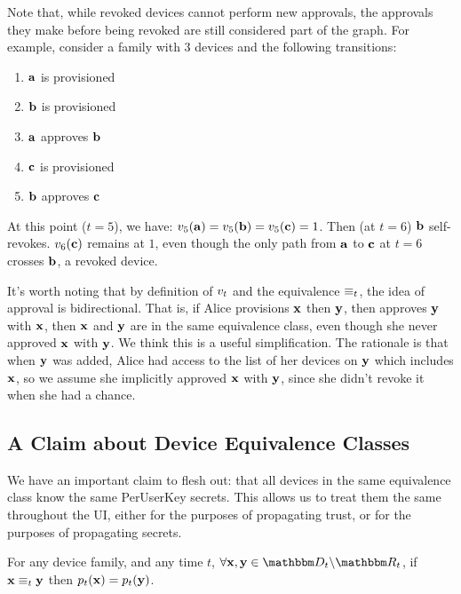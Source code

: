 Note that, while revoked devices cannot perform new approvals, the approvals they make before being
revoked are still considered part of the graph. For example, consider a family with 3 devices and
the following transitions: 
\begin{enumerate}
  \item $\mathbf{a}$ is provisioned
  \item $\mathbf{b}$ is provisioned
  \item $\mathbf{a}$ approves $\mathbf{b}$
  \item $\mathbf{c}$ is provisioned
  \item $\mathbf{b}$ approves $\mathbf{c}$
\end{enumerate}
At this point ($t=5$), we have: $v_5(\mathbf{a}) = v_5(\mathbf{b}) = v_5(\mathbf{c}) =
1$. Then (at $t=6$) $\mathbf{b}$ self-revokes. $v_6(\mathbf{c})$ remains at $1$, even though the
only path from $\mathbf{a}$ to $\mathbf{c}$ at $t=6$ crosses $\mathbf{b}$, a revoked device.

It's worth noting that by definition of $v_t$ and the equivalence $\equiv_{t}$, the idea of
approval is bidirectional. That is, if Alice provisions $\mathbf{x}$ then $\mathbf{y}$, then approves
$\mathbf{y}$ with $\mathbf{x}$, then $\mathbf{x}$ and $\mathbf{y}$ are in the same equivalence class, even
though she never approved $\mathbf{x}$ with $\mathbf{y}$. We think this is a useful simplification. The
rationale is that when $\mathbf{y}$ was added, Alice had access to the list of her devices on
$\mathbf{y}$ which includes $\mathbf{x}$, so we assume she implicitly approved $\mathbf{x}$ with
$\mathbf{y}$, since she didn't revoke it when she had a chance.

\subsection{A Claim about Device Equivalence Classes}

We have an important claim to flesh out: that all devices in the same equivalence class know the
same PerUserKey secrets. This allows us to treat them the same throughout the UI, either for the
purposes of propagating trust, or for the purposes of propagating secrets.

\begin{theorem}
 For any device family, and any time $t$, $\forall \zdev{x}, \zdev{y} \in \zactive{t}$, if $\mathbf{x}
  \equiv_{t} \mathbf{y}$ then $p_t(\mathbf{x}) = p_t(\mathbf{y})$.
\label{thm:know_puks}
\end{theorem}

